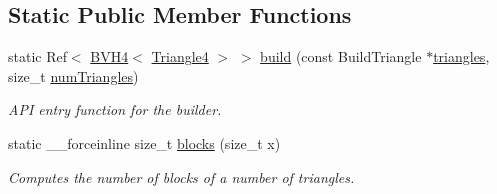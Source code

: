 \subsection*{Static Public Member Functions}
\begin{DoxyCompactItemize}
\item 
\hypertarget{classembree_1_1_b_v_h4_builder_a06835538b2d6bb9df8f9c1b7e2f7036d}{
static Ref$<$ \hyperlink{classembree_1_1_b_v_h4}{BVH4}$<$ \hyperlink{structembree_1_1_triangle4}{Triangle4} $>$ $>$ \hyperlink{classembree_1_1_b_v_h4_builder_a06835538b2d6bb9df8f9c1b7e2f7036d}{build} (const BuildTriangle $\ast$\hyperlink{classembree_1_1_b_v_h4_builder_af89f5d1b610f84ab13f6868b2b41e8c6}{triangles}, size\_\-t \hyperlink{classembree_1_1_b_v_h4_builder_a69ad7ed26f43d932fd56a32368cf2482}{numTriangles})}
\label{classembree_1_1_b_v_h4_builder_a06835538b2d6bb9df8f9c1b7e2f7036d}

\begin{DoxyCompactList}\small\item\em API entry function for the builder. \item\end{DoxyCompactList}\item 
static \_\-\_\-forceinline size\_\-t \hyperlink{classembree_1_1_b_v_h4_builder_a31ab848627b70f579b0a3aa60b9fd394}{blocks} (size\_\-t x)
\begin{DoxyCompactList}\small\item\em Computes the number of blocks of a number of triangles. \item\end{DoxyCompactList}\end{DoxyCompactItemize}
